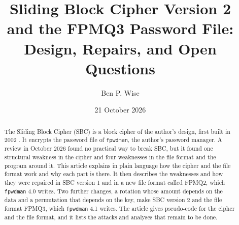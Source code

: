 


\usepackage{array} %
\usepackage{placeins} %
\setlength{\headheight}{14.5pt} %

\makeatletter
\setlength{\@fptop}{0pt}
\makeatother
\renewcommand{\topfraction}{0.9}
\renewcommand{\bottomfraction}{0.8}
\renewcommand{\textfraction}{0.1}
\renewcommand{\floatpagefraction}{0.8}


\newcommand{\code}[1]{\texttt{#1}}
\newcommand{\xor}{\oplus}
\newcommand{\rotl}{\lll}

\title{Sliding Block Cipher Version 2\\ and the FPMQ3 Password File:\\
Design, Repairs, and Open Questions}
\author{Ben P. Wise}
\date{21 October 2026}



\maketitle

\begin{abstract}
The Sliding Block Cipher (SBC) is a block cipher of the author's design, first
built in 2002 \cite{wise2006}. It encrypts the password file of \code{fpwdman}, the author's
password manager. A review in October 2026 found no practical way to break SBC,
but it found one structural weakness in the cipher and four weaknesses in the
file format and the program around it. This article explains in plain language how the cipher
and the file format work and why each part is there. It then describes the
weaknesses and how they were repaired in SBC version 1 and in a new file format
called FPMQ2, which \code{fpwdman} 4.0 writes. Two further changes, a rotation
whose amount depends on the data and a permutation that depends on the key,
make SBC version 2 and the file format FPMQ3, which \code{fpwdman} 4.1 writes.
The article gives pseudo-code for the cipher and the file format, and it lists
the attacks and analyses that remain to be done.
\end{abstract}


